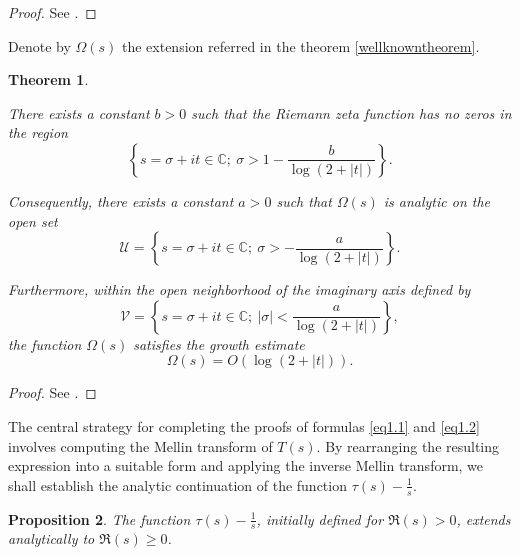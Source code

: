 \documentclass[11pt]{amsart}
\newtheorem{theorem}{Theorem}[section]
\newtheorem{proposition}[theorem]{Proposition}
\numberwithin{equation}{section}
\newcommand{\C}{\mathbb{C}}
\newcommand{\difrac}{\displaystyle \frac}
\begin{document}
\begin{proof} See \cite{Sutherland}. \end{proof}

Denote by $\Omega(s)$ the extension referred in the theorem \ref{wellknowntheorem}.

\begin{theorem} \label{wellknowntheorem2}

There exists a constant $b > 0$ such that the Riemann zeta function has no zeros in the region $$\left\{s = \sigma + it \in \C; \ \sigma > 1 - \difrac{b}{\log(2+|t|)}\right\}.$$

\noindent Consequently, there exists a constant $a > 0$ such that $\Omega(s)$ is analytic on the open set $$\mathcal{U} = \left\{s = \sigma + it \in \C; \ \sigma > - \difrac{a}{\log(2+|t|)}\right\}.$$

\noindent Furthermore, within the open neighborhood of the imaginary axis defined by $$\mathcal{V} = \left\{s = \sigma + it \in \C; \ |\sigma| < \difrac{a}{\log(2+|t|)}\right\},$$ the function $\Omega(s)$ satisfies the growth estimate $$\Omega(s) = O(\log(2 + |t|)).$$ 

\end{theorem}

\begin{proof} See \cite{Davenport}. \end{proof}

The central strategy for completing the proofs of formulas \ref{eq1.1} and \ref{eq1.2} involves computing the Mellin transform of $T(s)$. By rearranging the resulting expression into a suitable form and applying the inverse Mellin transform, we shall establish the analytic continuation of the function $\tau(s) - \difrac{1}{s}$.

\begin{proposition}

The function $\tau(s) - \difrac{1}{s}$, initially defined for $\Re(s) > 0$, extends analytically to $\Re(s) \geq 0$.

\end{proposition}
\end{document}
